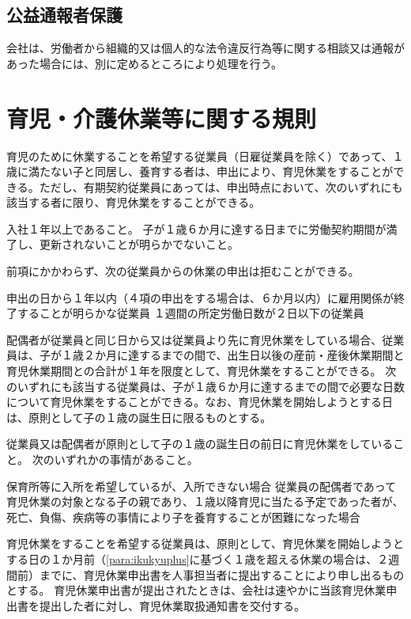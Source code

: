 \documentclass[10pt,a4paper,uplatex]{jsarticle}
\begin{document}
\subsection{公益通報者保護}

会社は、労働者から組織的又は個人的な法令違反行為等に関する相談又は通報があった場合には、別に定めるところにより処理を行う。



\clearpage
\section{育児・介護休業等に関する規則}

育児のために休業することを希望する従業員（日雇従業員を除く）であって、１歳に満たない子と同居し、養育する者は、申出により、育児休業をすることができる。ただし、有期契約従業員にあっては、申出時点において、次のいずれにも該当する者に限り、育児休業をすることができる。
\label{para:ChildcareLayoff}
\begin{enumerate}
    \itm 入社１年以上であること。
    \itm 子が１歳６か月に達する日までに労働契約期間が満了し、更新されないことが明らかでないこと。
\end{enumerate}
\term 前項にかかわらず、次の従業員からの休業の申出は拒むことができる。
\begin{enumerate}
    \itm 申出の日から１年以内（４項の申出をする場合は、６か月以内）に雇用関係が終了することが明らかな従業員
    \itm １週間の所定労働日数が２日以下の従業員
\end{enumerate}
\term 配偶者が従業員と同じ日から又は従業員より先に育児休業をしている場合、従業員は、子が１歳２か月に達するまでの間で、出生日以後の産前・産後休業期間と育児休業期間との合計が１年を限度として、育児休業をすることができる。
\label{para:ikukyuplus}
\term 次のいずれにも該当する従業員は、子が１歳６か月に達するまでの間で必要な日数について育児休業をすることができる。なお、育児休業を開始しようとする日は、原則として子の１歳の誕生日に限るものとする。
\begin{enumerate}
    \itm 従業員又は配偶者が原則として子の１歳の誕生日の前日に育児休業をしていること。
    \itm 次のいずれかの事情があること。
    \begin{enumerate}
        \itm 保育所等に入所を希望しているが、入所できない場合
        \itm 従業員の配偶者であって育児休業の対象となる子の親であり、１歳以降育児に当たる予定であった者が、死亡、負傷、疾病等の事情により子を養育することが困難になった場合
    \end{enumerate}
\end{enumerate}
\term 育児休業をすることを希望する従業員は、原則として、育児休業を開始しようとする日の１か月前（\ref{para:ikukyuplus}に基づく１歳を超える休業の場合は、２週間前）までに、育児休業申出書を人事担当者に提出することにより申し出るものとする。
\term 育児休業申出書が提出されたときは、会社は速やかに当該育児休業申出書を提出した者に対し、育児休業取扱通知書を交付する。
\end{document}
